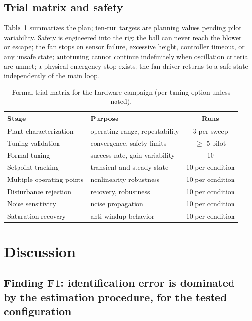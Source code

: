 \documentclass[10pt,twocolumn]{article}
\begin{document}
\subsection{Trial matrix and safety}

Table~\ref{tab:matrix} summarizes the plan; ten-run targets are planning values pending pilot variability. Safety is engineered into the rig: the ball can never reach the blower or escape; the fan stops on sensor failure, excessive height, controller timeout, or any unsafe state; autotuning cannot continue indefinitely when oscillation criteria are unmet; a physical emergency stop exists; the fan driver returns to a safe state independently of the main loop.

\begin{table}[t]
\centering
\caption{Formal trial matrix for the hardware campaign (per tuning option unless noted).}
\label{tab:matrix}
\footnotesize
\setlength{\tabcolsep}{3pt}
\begin{tabular}{@{}p{2.4cm}p{3.0cm}c@{}}
\toprule
Stage & Purpose & Runs \\
\midrule
Plant characterization & operating range, repeatability & 3 per sweep \\
Tuning validation & convergence, safety limits & $\ge$ 5 pilot \\
Formal tuning & success rate, gain variability & 10 \\
Setpoint tracking & transient and steady state & 10 per condition \\
Multiple operating points & nonlinearity robustness & 10 per condition \\
Disturbance rejection & recovery, robustness & 10 per condition \\
Noise sensitivity & noise propagation & 10 per condition \\
Saturation recovery & anti-windup behavior & 10 per condition \\
\bottomrule
\end{tabular}
\end{table}

\section{Discussion}
\label{sec:discussion}

\subsection{Finding F1: identification error is dominated by the estimation procedure, for the tested configuration}
\end{document}
